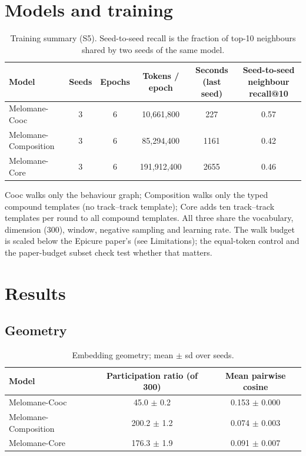 \documentclass[11pt,a4paper]{article}
\begin{document}
\section*{Models and training}
\begin{table}[h]\centering\small
\begin{tabular}{lccccc}
\toprule
\textbf{Model} & \textbf{Seeds} & \textbf{Epochs} & \textbf{Tokens / epoch} & \textbf{Seconds (last seed)} & \textbf{Seed-to-seed neighbour recall@10} \\
\midrule
Melomane-Cooc & 3 & 6 & 10,661,800 & 227 & 0.57 \\
Melomane-Composition & 3 & 6 & 85,294,400 & 1161 & 0.42 \\
Melomane-Core & 3 & 6 & 191,912,400 & 2655 & 0.46 \\
\bottomrule
\end{tabular}
\caption{Training summary (S5). Seed-to-seed recall is the fraction of top-10 neighbours shared by two seeds of the same model.}
\end{table}

Cooc walks only the behaviour graph; Composition walks only the typed compound templates (no track--track template); Core adds ten track--track templates per round to all compound templates. All three share the vocabulary, dimension (300), window, negative sampling and learning rate. The walk budget is scaled below the Epicure paper's (see Limitations); the equal-token control and the paper-budget subset check test whether that matters.

\section*{Results}
\subsection*{Geometry}
\begin{table}[h]\centering\small
\begin{tabular}{lcc}
\toprule
\textbf{Model} & \textbf{Participation ratio (of 300)} & \textbf{Mean pairwise cosine} \\
\midrule
Melomane-Cooc & 45.0 $\pm$ 0.2 & 0.153 $\pm$ 0.000 \\
Melomane-Composition & 200.2 $\pm$ 1.2 & 0.074 $\pm$ 0.003 \\
Melomane-Core & 176.3 $\pm$ 1.9 & 0.091 $\pm$ 0.007 \\
\bottomrule
\end{tabular}
\caption{Embedding geometry; mean $\pm$ sd over seeds.}
\end{table}
\end{document}
